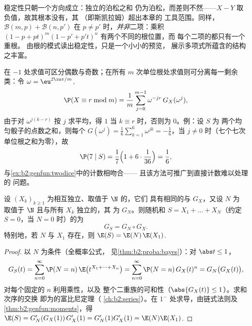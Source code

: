 \begin{remark}
稳定性只朝一个方向成立：独立的泊松之和
仍为泊松，而差则不然——$X - Y$ 取
负值，故其根本没有，其
（即斯凯拉姆）超出本章的
工具范围。同样，$\mathcal B(m, p) + \mathcal B(n, p')$ 在
$p \neq p'$ 时，\emph{并非}二项：乘积 $(1 - p +
pt)^m(1 - p' + p't)^n$ 有两个不同的根位置，而
每个二项的都只有一个重根。
由根的模式读出稳定性，只是一个小小的预览，
展示多项式所蕴含的结构之丰富。
\end{remark}

\begin{remark}[单位根滤波]
在 $-1$ 处求值可区分偶数与奇数；在所有
$m$ 次单位根处求值则可分离每一剩余类：令
$\omega = \eu^{2\iu\pi/m}$,
\[
\P(X \equiv r \bmod m)
= \frac1m\sum_{j=0}^{m-1}\omega^{-jr}\,G_X(\omega^j),
\]
由于对 $\omega^{j(k-r)}$ 按 $j$ 求平均，得 $1$ 当 $k
\equiv r$ 时，否则为 $0$。例：设 $S$ 为
两个均匀骰子的点数之和，则每个 $G(\omega^j) = \frac16\sum_{k=1}^6
\omega^{jk} = -\frac16$，当 $j \neq 0$ 时（七个七次
单位根之和为零），故
\[
\P(7 \mid S) = \frac17\Bigl(1 +
6\cdot\frac1{36}\Bigr) = \frac16 ,
\]
与\cref{ex:b2:genfun:twodice}中的计数相吻合——
且该方法可推广到直接计数难以处理的
问题。
\end{remark}

\begin{theorem}\label{thm:b2:genfun:compound}
设 $(X_k)_{k\geq1}$ 为相互独立、取值于 $\N$ 的，它们
具有相同的与 $G_X$，又设 $N$ 为
取值于 $\N$ 且与所有 $X_k$ 独立的，其
为 $G_N$。则随机和 $S = X_1 + \dots + X_N$（约定
$S = 0$，当 $N = 0$ 时）的为
\[
G_S = G_N \circ G_X .
\]
特别地，若 $N$ 与 $X_1$ 存在，则 $\E(S) =
\E(N)\,\E(X_1)$.
\end{theorem}

\begin{proof}
以 $N$ 为条件（全概率公式，
见\cref{thm:b2:proba:bayes}）：对 $\abs t \leq 1$，
\[
G_S(t) = \sum_{n=0}^\infty \P(N = n)\,
\E\bigl(t^{X_1 + \dots + X_n}\bigr)
= \sum_{n=0}^\infty \P(N = n)\,G_X(t)^n
= G_N\bigl(G_X(t)\bigr),
\]
对每个固定的 $n$ 利用乘性，以及
整个二重族的可和性（$\abs{G_X(t)} \leq 1$）。求和次序的交换
即为的富比尼定理（
\cref{ch:b2:series}）。在 $1^-$ 处求导，由链式法则及
\cref{thm:b2:genfun:moments}，得 $\E(S) = G_N'(G_X(1))\,G_X'(1)
= G_N'(1)G_X'(1) = \E(N)\E(X_1)$.
\end{proof}

